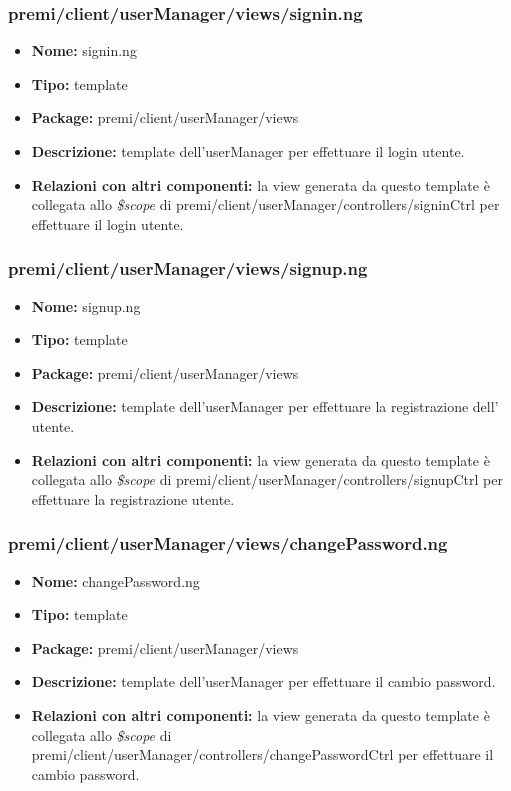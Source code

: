 \subsubsection{premi/client/userManager/views/signin.ng}
\begin{itemize}
  \item[] \textbf{Nome:} signin.ng
  \item[] \textbf{Tipo:} template
  \item[] \textbf{Package:} premi/client/userManager/views
  \item[] \textbf{Descrizione:} template dell'userManager per effettuare il login utente.
  \item[] \textbf{Relazioni con altri componenti:} la view generata da questo template è collegata allo \textit{\$scope} di premi/client/userManager/controllers/signinCtrl per effettuare il login utente.
\end{itemize}

\subsubsection{premi/client/userManager/views/signup.ng}
\begin{itemize}
  \item[] \textbf{Nome:} signup.ng
  \item[] \textbf{Tipo:} template
  \item[] \textbf{Package:} premi/client/userManager/views
  \item[] \textbf{Descrizione:} template dell'userManager per effettuare la registrazione dell' utente.
  \item[] \textbf{Relazioni con altri componenti:} la view generata da questo template è collegata allo \textit{\$scope} di premi/client/userManager/controllers/signupCtrl per effettuare la registrazione utente.
\end{itemize}

\subsubsection{premi/client/userManager/views/changePassword.ng}
\begin{itemize}
  \item[] \textbf{Nome:} changePassword.ng
  \item[] \textbf{Tipo:} template
  \item[] \textbf{Package:} premi/client/userManager/views
  \item[] \textbf{Descrizione:} template dell'userManager per effettuare il cambio password.
  \item[] \textbf{Relazioni con altri componenti:} la view generata da questo template è collegata allo \textit{\$scope} di premi/client/userManager/controllers/changePasswordCtrl per effettuare il cambio password.
\end{itemize}

